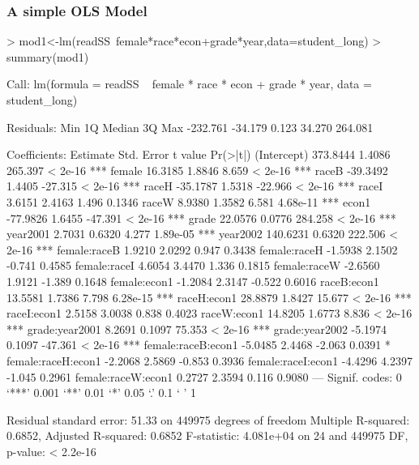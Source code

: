 \documentclass[12pt,handout]{beamer}
\begin{document}
\begin{frame}
\frametitle{A simple OLS Model}
\begin{Schunk}
\begin{Sinput}
> mod1<-lm(readSS~female*race*econ+grade*year,data=student_long)
> summary(mod1)
\end{Sinput}
\begin{Soutput}
Call:
lm(formula = readSS ~ female * race * econ + grade * year, data = student_long)

Residuals:
     Min       1Q   Median       3Q      Max 
-232.761  -34.179    0.123   34.270  264.081 

Coefficients:
                   Estimate Std. Error t value Pr(>|t|)    
(Intercept)        373.8444     1.4086 265.397  < 2e-16 ***
female              16.3185     1.8846   8.659  < 2e-16 ***
raceB              -39.3492     1.4405 -27.315  < 2e-16 ***
raceH              -35.1787     1.5318 -22.966  < 2e-16 ***
raceI                3.6151     2.4163   1.496   0.1346    
raceW                8.9380     1.3582   6.581 4.68e-11 ***
econ1              -77.9826     1.6455 -47.391  < 2e-16 ***
grade               22.0576     0.0776 284.258  < 2e-16 ***
year2001             2.7031     0.6320   4.277 1.89e-05 ***
year2002           140.6231     0.6320 222.506  < 2e-16 ***
female:raceB         1.9210     2.0292   0.947   0.3438    
female:raceH        -1.5938     2.1502  -0.741   0.4585    
female:raceI         4.6054     3.4470   1.336   0.1815    
female:raceW        -2.6560     1.9121  -1.389   0.1648    
female:econ1        -1.2084     2.3147  -0.522   0.6016    
raceB:econ1         13.5581     1.7386   7.798 6.28e-15 ***
raceH:econ1         28.8879     1.8427  15.677  < 2e-16 ***
raceI:econ1          2.5158     3.0038   0.838   0.4023    
raceW:econ1         14.8205     1.6773   8.836  < 2e-16 ***
grade:year2001       8.2691     0.1097  75.353  < 2e-16 ***
grade:year2002      -5.1974     0.1097 -47.361  < 2e-16 ***
female:raceB:econ1  -5.0485     2.4468  -2.063   0.0391 *  
female:raceH:econ1  -2.2068     2.5869  -0.853   0.3936    
female:raceI:econ1  -4.4296     4.2397  -1.045   0.2961    
female:raceW:econ1   0.2727     2.3594   0.116   0.9080    
---
Signif. codes:  0 ‘***’ 0.001 ‘**’ 0.01 ‘*’ 0.05 ‘.’ 0.1 ‘ ’ 1 

Residual standard error: 51.33 on 449975 degrees of freedom
Multiple R-squared: 0.6852,  Adjusted R-squared: 0.6852 
F-statistic: 4.081e+04 on 24 and 449975 DF,  p-value: < 2.2e-16 
\end{Soutput}
\end{Schunk}
\end{frame}
\end{document}
